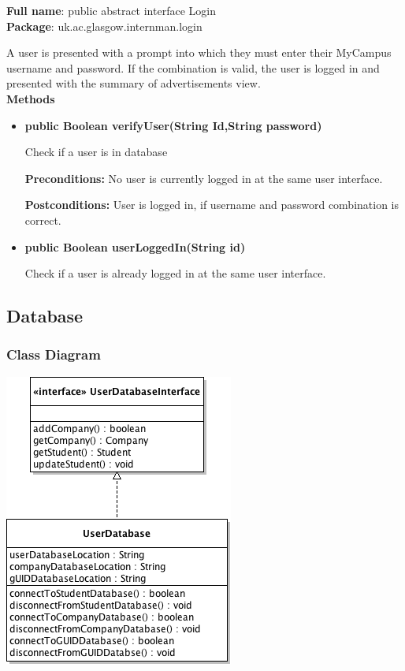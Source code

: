 \documentclass[11pt]{article}
\begin{document}
\textbf{Full name}: public abstract interface Login\\

\textbf{Package}: uk.ac.glasgow.internman.login

A user is presented with a prompt into which they must enter their MyCampus 
username and password. If the combination is valid, the user is logged in and 
presented with the summary of advertisements view.\\

\textbf{Methods}

\begin{itemize}

\item{\textbf{public Boolean verifyUser(String Id,String password)}

Check if a user is in database 

\textbf{Preconditions:} No user is currently logged in at the same user 
interface.

\textbf{Postconditions:} User is logged in, if username and password combination 
is correct.}

\item{\textbf{public Boolean userLoggedIn(String id)}

Check if a user is already logged in at the same user interface.}

\end{itemize}

\newpage

\subsection{Database}

\subsubsection{Class Diagram}

\includegraphics{databaseClassDiagram.png}
\end{document}
